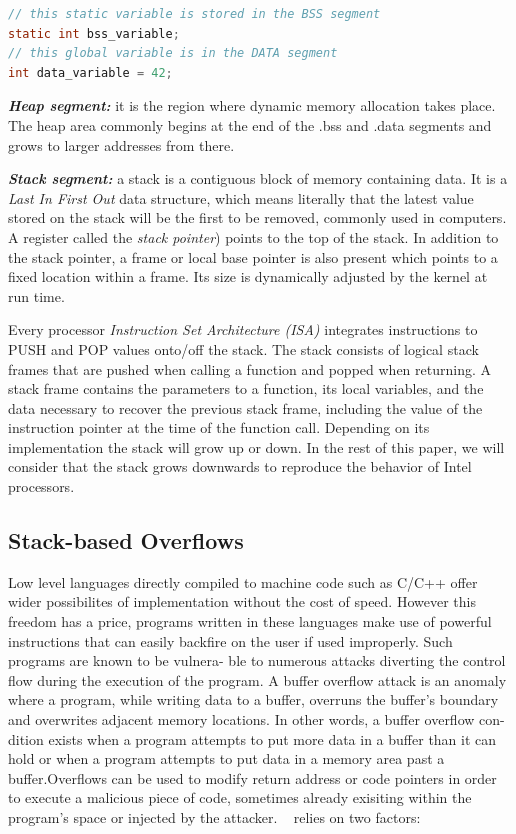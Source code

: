 \documentclass[10pt,twocolumn]{article}
\begin{document}
\bigskip
\begin{lstlisting}[caption=Variable location in memory,language=C] 
// this static variable is stored in the BSS segment
static int bss_variable;
// this global variable is in the DATA segment
int data_variable = 42; 
\end{lstlisting}
\medskip

\textbf{\textit{Heap segment:}} it is the region where dynamic memory allocation
takes place. The heap area commonly begins at the end of the .bss and .data
segments and grows to larger addresses from there.

\textit{\textbf{Stack segment:}} a stack is a contiguous block of memory
containing data. It is a \textit{Last In First Out} data structure, which means
literally that the latest value stored on the stack will be the first to be
removed, commonly used
in computers. A register called the \textit{stack pointer}) points to
the top of the stack. In addition to the stack pointer, a frame or local base
pointer is also present which points to a fixed location within a frame. Its
size is dynamically adjusted by the kernel at run time.

Every processor \textit{Instruction Set Architecture (ISA)} integrates instructions
to PUSH and POP values onto/off the stack. The stack consists of logical stack
frames that are pushed when calling a function and popped when returning. A
stack frame contains the parameters to a function, its local variables, and the
data necessary to recover the previous stack frame, including the value of the
instruction pointer at the time of the function call. Depending on its
implementation the stack will grow up or down. In the rest of this paper, we
will consider that the stack grows downwards to reproduce the behavior of Intel
processors.

\subsection{Stack-based Overflows}

Low level languages directly compiled to
machine code such as C/C++ offer wider possibilites of implementation without
the cost of speed. However this freedom has a price, programs written in these
languages make use of powerful instructions that can easily backfire on the
user if used improperly. Such programs are known to be vulnera- ble to numerous
attacks diverting the control flow during the execution of the program.  A
buffer overflow attack is an anomaly where a program, while writing data to a
buffer, overruns the buffer’s boundary and overwrites adjacent memory
locations. In other words, a buffer overflow con- dition exists when a program
attempts to put more data in a buffer than it can hold or when a program
attempts to put data in a memory area past a buffer.Overflows can be used to
modify return address or code pointers in order to execute a malicious piece of
code, sometimes already exisiting within the program’s space or injected by the
attacker.  ~\cite{one_stacksmashing_1996} relies on two factors:
\end{document}
